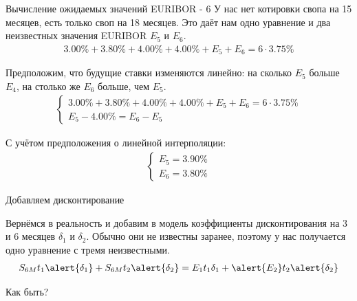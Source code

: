 \documentclass{beamer}
\begin{document}
\begin{frame}{Вычисление ожидаемых значений EURIBOR - 6}
\justify
У нас нет котировки свопа на 15 месяцев, есть только своп на 18 месяцев. Это даёт нам одно уравнение и два неизвестных значения EURIBOR $E_5$ и $E_6$.
\begin{align*}
3.00\%+3.80\%+4.00\%+4.00\%+E_5+E_6 = 6\cdot3.75\%
\end{align*}

\justify
Предположим, что будущие ставки изменяются линейно: на сколько $E_5$ больше $E_4$, на столько же $E_6$ больше, чем $E_5$.
\begin{align*}
\begin{cases}
3.00\%+3.80\%+4.00\%+4.00\%+E_5+E_6 = 6\cdot3.75\% \\
E_5 - 4.00\% = E_6 - E_5
\end{cases}
\end{align*}

С учётом предположения о линейной интерполяции:
\begin{align*}
\begin{cases}
E_5 = 3.90\% \\
E_6 = 3.80\%
\end{cases}
\end{align*}
\end{frame}



\begin{frame}{Добавляем дисконтирование}
\centering
{}

\justify
Вернёмся в реальность и добавим в модель коэффициенты дисконтирования на 3 и 6 месяцев $\delta_1$ и $\delta_2$. Обычно они не известны заранее, поэтому у нас получается одно уравнение с тремя неизвестными.
\begin{align*}
S_{6M}t_1\alert{\delta_1} + S_{6M}t_2\alert{\delta_2} = E_1t_1\delta_1 + \alert{E_2}t_2\alert{\delta_2}
\end{align*}

\justify
Как быть?
\end{frame}
\end{document}
